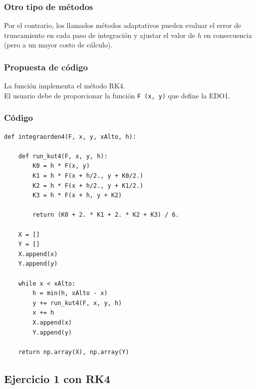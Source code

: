 \documentclass[12pt]{beamer}
\begin{document}
\begin{frame}
\frametitle{Otro tipo de métodos}
Por el contrario, los llamados \textcolor{darkcerulean}{métodos adaptativos} pueden evaluar el error de truncamiento en cada paso de integración y ajustar el valor de $h$ en consecuencia (pero a un mayor costo de cálculo).
\end{frame}
\begin{frame}
\frametitle{Propuesta de código}
La función  implementa el método RK4.
\\
\bigskip
\pause
El usuario debe de proporcionar la función \texttt{F (x, y)} que define la EDO1.
\end{frame}
\begin{frame}
\frametitle{Código}
\begin{lstlisting}[caption=Código para el método RK4]
def integraorden4(F, x, y, xAlto, h):

    def run_kut4(F, x, y, h):
        K0 = h * F(x, y)
        K1 = h * F(x + h/2., y + K0/2.)
        K2 = h * F(x + h/2., y + K1/2.)
        K3 = h * F(x + h, y + K2)
        
        return (K0 + 2. * K1 + 2. * K2 + K3) / 6.
    
    X = []
    Y = []
    X.append(x)
    Y.append(y)
    
    while x < xAlto:
        h = min(h, xAlto - x)
        y += run_kut4(F, x, y, h)
        x += h
        X.append(x)
        Y.append(y)
    
    return np.array(X), np.array(Y)
\end{lstlisting}
\end{frame}

\subsection{Ejercicio 1 con RK4}
\end{document}
